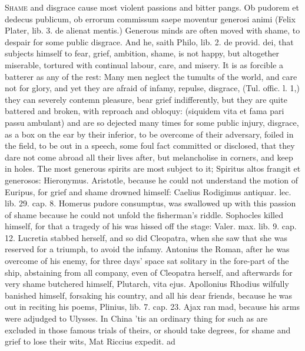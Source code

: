 {\lettrine{S}{hame} and disgrace cause most violent passions and bitter pangs. Ob
pudorem et dedecus publicum, ob errorum commissum saepe moventur
generosi animi (Felix Plater, lib. 3. de alienat mentis.) Generous
minds are often moved with shame, to despair for some public disgrace.
And he, saith Philo, lib. 2. de provid. dei, that subjects
himself to fear, grief, ambition, shame, is not happy, but altogether
miserable, tortured with continual labour, care, and misery. It is as
forcible a batterer as any of the rest: Many men neglect the
tumults of the world, and care not for glory, and yet they are afraid
of infamy, repulse, disgrace, (Tul. offic. l. 1,) they can severely
contemn pleasure, bear grief indifferently, but they are quite
battered and broken, with reproach and obloquy: (siquidem vita et
fama pari passu ambulant) and are so dejected many times for some
public injury, disgrace, as a box on the ear by their inferior, to be
overcome of their adversary, foiled in the field, to be out in a
speech, some foul fact committed or disclosed, \etc{} that they dare not
come abroad all their lives after, but melancholise in corners, and
keep in holes. The most generous spirits are most subject to it;
Spiritus altos frangit et generosos: Hieronymus. Aristotle, because he
could not understand the motion of Euripus, for grief and shame drowned
himself: Caelius Rodigimus antiquar. lec. lib. 29. cap. 8. Homerus
pudore consumptus, was swallowed up with this passion of shame 
because he could not unfold the fisherman's riddle. Sophocles killed
himself, for that a tragedy of his was hissed off the stage:
Valer. max. lib. 9. cap. 12. Lucretia stabbed herself, and so did
Cleopatra, when she saw that she was reserved for a triumph, to
avoid the infamy. Antonius the Roman, after he was overcome of
his enemy, for three days' space sat solitary in the fore-part of the
ship, abstaining from all company, even of Cleopatra herself, and
afterwards for very shame butchered himself, Plutarch, vita ejus.
Apollonius Rhodius wilfully banished himself, forsaking his
country, and all his dear friends, because he was out in reciting his
poems, Plinius, lib. 7. cap. 23. Ajax ran mad, because his arms were
adjudged to Ulysses. In China 'tis an ordinary thing for such as are
excluded in those famous trials of theirs, or should take degrees, for
shame and grief to lose their wits, Mat Riccius expedit. ad
}
